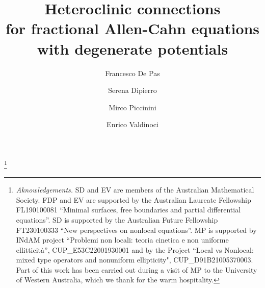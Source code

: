 \documentclass[10pt,a4paper]{amsart}
\numberwithin{equation}{section}
\begin{document}
	
\title[Fractional Allen-Cahn equations]{Heteroclinic connections \\
for fractional Allen-Cahn equations\\ with degenerate potentials}

\author[F.~De~Pas]{Francesco De Pas} \address{Francesco De Pas\\  Department of Mathematics and Statistics\\
	University of Western Australia,\\
	35 Stirling Highway, WA 6009 Crawley, Australia}
	
\author[S.~Dipierro]{Serena Dipierro}  \address{Serena Dipierro\\  Department of Mathematics and Statistics\\
	University of Western Australia,\\
	35 Stirling Highway, WA 6009 Crawley, Australia}
	
	\author[M.~Piccinini]{Mirco Piccinini} 
\address{Mirco Piccinini\\
	Dipartimento di Scienze Matematiche, Fisiche e Informatiche, Universit\`a di Parma\\
	Parco Area delle Scienze 53/a, Campus, 43124 Parma, Italy, \ and \ Dipartimento di Matematica, Universit\`a di Pisa, ~L.go~B.~Pontecorvo~5, 56127, Pisa, Italy}


\author[E.~Valdinoci]{Enrico Valdinoci}  \address{Enrico Valdinoci\\Department of Mathematics and Statistics\\
	University of Western Australia,\\
	35 Stirling Highway, WA 6009 Crawley, Australia}

	

\thanks{{\it Aknowledgements.} 
SD and EV are members of the Australian Mathematical Society.
FDP and EV are supported by the Australian Laureate Fellowship FL190100081 ``Minimal
surfaces, free boundaries and partial differential equations''.
SD is supported by the Australian Future Fellowship
FT230100333 ``New perspectives on nonlocal equations''.
MP is supported by INdAM project  ``Problemi non locali: teoria cinetica e non uniforme ellitticit\`a'', CUP\_E53C22001930001 and by the Project ``Local vs Nonlocal: mixed type operators and nonuniform ellipticity", CUP\_D91B21005370003.
Part of this work has been carried out during a visit of MP to the University
of Western Australia, which we thank for the warm hospitality.}
\end{document}
